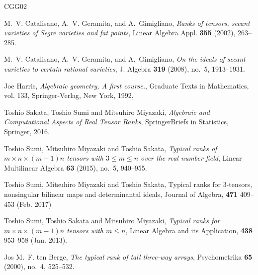 \documentclass[a4paper,12pt]{article}
\begin{document}
\begin{thebibliography}{CGG02}

M.~V. Catalisano, A.~V. Geramita, and A.~Gimigliano, \emph{Ranks of tensors,
  secant varieties of {S}egre varieties and fat points}, Linear Algebra Appl.
  \textbf{355} (2002), 263--285. 

M.~V. Catalisano, A.~V. Geramita, and A.~Gimigliano, \emph{On the 
ideals of secant varieties to certain rational
  varieties}, J. Algebra \textbf{319} (2008), no.~5, 1913--1931. 

Joe Harris, \emph{Algebraic geometry, A first course.}, Graduate Texts in Mathematics, vol. 133,
  Springer-Verlag, New York, 1992, 


Toshio Sakata, Toshio Sumi and Mitsuhiro Miyazaki, \emph{Algebraic and
  {C}omputational {A}spects of {R}eal {T}ensor {R}anks}, SpringerBriefs in
  Statistics, Springer, 2016.

Toshio Sumi, Mitsuhiro Miyazaki and Toshio Sakata, \emph{Typical ranks of
  {$m\times n\times (m-1)n$} tensors with {$3\leq m\leq n$} over the real
  number field}, Linear Multilinear Algebra \textbf{63} (2015), no.~5,
  940--955. 


Toshio Sumi, Mitsuhiro Miyazaki and Toshio Sakata,
Typical ranks for 3-tensors, nonsingular bilinear maps and determinantal ideals,
Journal of Algebra,
{\bf 471} 409--453 (Feb. 2017)


Toshio Sumi, Toshio Sakata and Mitsuhiro Miyazaki,
\emph{Typical ranks for $m\times n\times (m-1)n$ tensors with $m\leq n$},
Linear Algebra and its Application, 
\textbf {438} 953--958 (Jan. 2013). 


Jos M.~F. ten Berge, \emph{The typical rank of tall three-way arrays},
  Psychometrika \textbf{65} (2000), no.~4, 525--532. 

\end{thebibliography}
\end{document}

